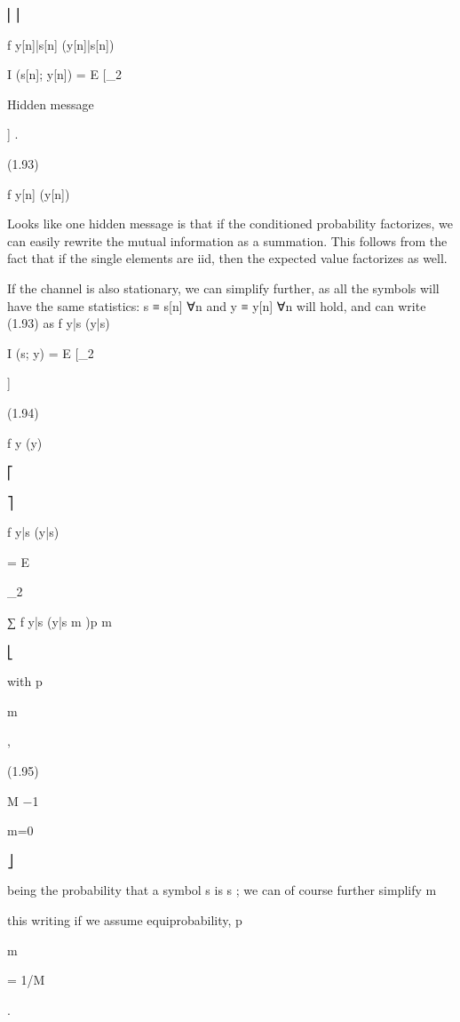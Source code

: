 ⎢⎥

f y[n]|s[n] (y[n]|s[n])

I (s[n]; y[n]) = E [\log_2

​Hidden message

] .

(1.93)

f y[n] (y[n])

Looks like one hidden message is that if the conditioned probability factorizes, we can easily rewrite the mutual information as a summation.
This follows from the fact that if the single elements are iid, then the expected value factorizes as well.

If the channel is also stationary, we can simplify further, as all the symbols will have the same statistics: s ≡ s[n] ∀n and y ≡ y[n] ∀n will hold, and can write (1.93) as f y|s (y|s)

I (s; y) = E [\log_2

]

(1.94)

f y (y)

⎡

⎤

f y|s (y|s)

= E

\log_2

∑ f y|s (y|s m )p m

⎣

with p

m

,

(1.95)

M −1

m=0

⎦

being the probability that a symbol s is s ; we can of course further simplify m

this writing if we assume equiprobability, p

m

= 1/M

.

